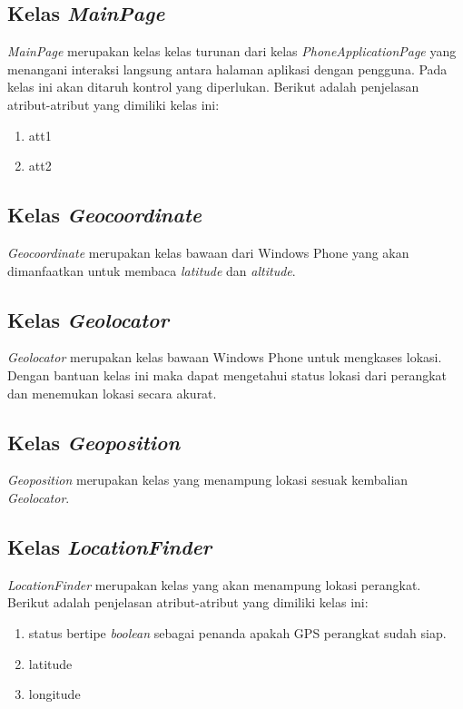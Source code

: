 \subsection{Kelas \textit{MainPage}}
\label{lab:Kelas MainPage}
\hspace{0.5cm} \textit{MainPage} merupakan kelas kelas turunan dari kelas \textit{PhoneApplicationPage} yang menangani interaksi langsung antara halaman aplikasi dengan pengguna. Pada kelas ini akan ditaruh kontrol yang diperlukan. Berikut adalah penjelasan atribut-atribut yang dimiliki kelas ini:
\begin{enumerate}
	\item att1
	\item att2
\end{enumerate}

\subsection{Kelas \textit{Geocoordinate}}
\label{lab:Kelas Geocoordinate}
\hspace{0.5cm} \textit{Geocoordinate} merupakan kelas bawaan dari Windows Phone yang akan dimanfaatkan untuk membaca \textit{latitude} dan \textit{altitude}.

\subsection{Kelas \textit{Geolocator}}
\label{lab:Kelas Geolocator}
\hspace{0.5cm} \textit{Geolocator} merupakan kelas bawaan Windows Phone untuk mengkases lokasi. Dengan bantuan kelas ini maka dapat mengetahui status lokasi dari perangkat dan menemukan lokasi secara akurat.

\subsection{Kelas \textit{Geoposition}}
\label{lab:Kelas Geoposition}
\hspace{0.5cm} \textit{Geoposition} merupakan kelas yang menampung lokasi sesuak kembalian \textit{Geolocator}.

\subsection{Kelas \textit{LocationFinder}}
\label{lab:Kelas LocationFinder}
\hspace{0.5cm} \textit{LocationFinder} merupakan kelas yang akan menampung lokasi perangkat. Berikut adalah penjelasan atribut-atribut yang dimiliki kelas ini:
\begin{enumerate}
	\item status bertipe \textit{boolean} sebagai penanda apakah GPS perangkat sudah siap.
	\item latitude
	\item longitude
\end{enumerate}

